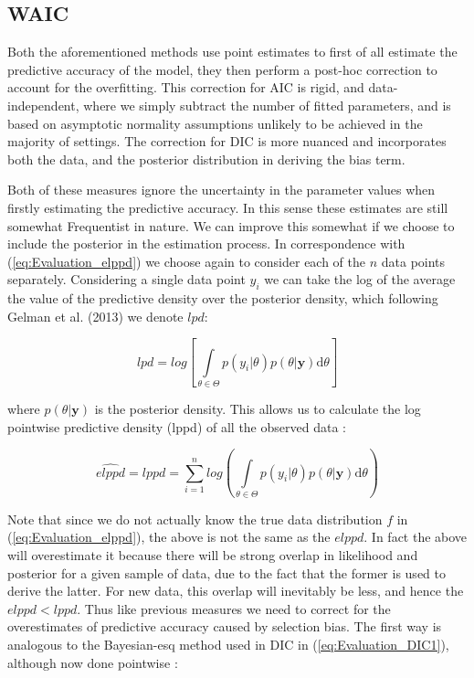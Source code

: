 \documentclass[11pt,fullpage]{book}
\begin{document}
\subsection{WAIC}
Both the aforementioned methods use point estimates to first of all estimate the predictive accuracy of the model, they then perform a post-hoc correction to account for the overfitting. This correction for AIC is rigid, and data-independent, where we simply subtract the number of fitted parameters, and is based on asymptotic normality assumptions unlikely to be achieved in the majority of settings. The correction for DIC is more nuanced and incorporates both the data, and the posterior distribution in deriving the bias term. 

Both of these measures ignore the uncertainty in the parameter values when firstly estimating the predictive accuracy. In this sense these estimates are still somewhat Frequentist in nature. We can improve this somewhat if we choose to include the posterior in the estimation process. In correspondence with (\ref{eq:Evaluation_elppd}) we choose again to consider each of the $n$ data points separately. Considering a single data point $y_i$ we can take the log of the average the value of the predictive density over the posterior density, which following Gelman et al. (2013) we denote $lpd$:

\begin{equation}
lpd = log \left[\int\limits_{\theta\in\Theta} p(y_i|\theta)p(\theta|\boldsymbol{y}) \mathrm{d}\theta\right]
\end{equation}

where $p(\theta|\boldsymbol{y})$ is the posterior density. This allows us to calculate the log pointwise predictive density (lppd) of all the observed data \cite{gelman2013bayesian}:

\begin{equation}\label{eq:Evaluation_WAIC}
\widehat{elppd} = lppd = \sum\limits_{i=1}^{n} log\left(\int\limits_{\theta\in\Theta} p(y_i|\theta)p(\theta|\boldsymbol{y})\mathrm{d}\theta\right)
\end{equation}

Note that since we do not actually know the true data distribution $f$ in (\ref{eq:Evaluation_elppd}), the above is not the same as the $elppd$. In fact the above will overestimate it because there will be strong overlap in likelihood and posterior for a given sample of data, due to the fact that the former is used to derive the latter. For new data, this overlap will inevitably be less, and hence the $elppd<lppd$. Thus like previous measures we need to correct for the overestimates of predictive accuracy caused by selection bias. The first way is analogous to the Bayesian-esq method used in DIC in (\ref{eq:Evaluation_DIC1}), although now done pointwise \cite{gelman2013bayesian}:
\end{document}
